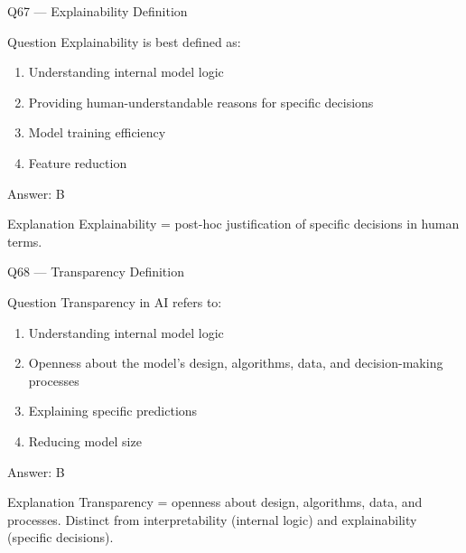 \documentclass[aspectratio=169,8pt]{beamer}
\begin{document}
	\begin{frame}{Q67 --- Explainability Definition}
		\begin{block}{Question}
			Explainability is best defined as:
			\begin{enumerate}
				\item Understanding internal model logic
				\item Providing human-understandable reasons for specific decisions
				\item Model training efficiency
				\item Feature reduction
			\end{enumerate}
		\end{block}
		\begin{exampleblock}{Answer: B}\end{exampleblock}
		\begin{block}{Explanation}
			Explainability = post-hoc justification of specific decisions in human terms.
		\end{block}
	\end{frame}
	
	\begin{frame}{Q68 --- Transparency Definition}
		\begin{block}{Question}
			Transparency in AI refers to:
			\begin{enumerate}
				\item Understanding internal model logic
				\item Openness about the model's design, algorithms, data, and decision-making processes
				\item Explaining specific predictions
				\item Reducing model size
			\end{enumerate}
		\end{block}
		\begin{exampleblock}{Answer: B}\end{exampleblock}
		\begin{block}{Explanation}
			Transparency = openness about design, algorithms, data, and processes. Distinct from interpretability (internal logic) and explainability (specific decisions).
		\end{block}
	\end{frame}
	
\end{document}
